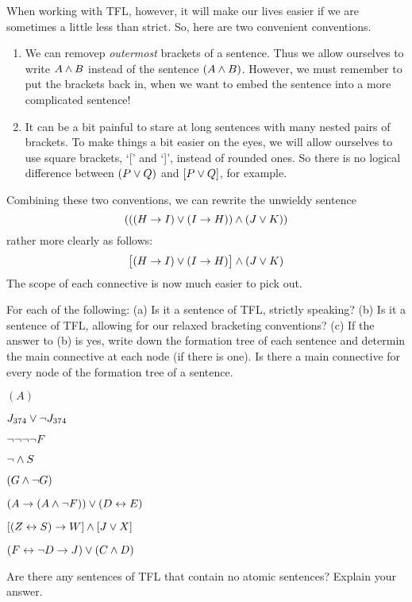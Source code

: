 When working with TFL, however, it will make our lives easier if we are sometimes a little less than strict. So, here are two convenient conventions.
\begin{enumerate}
\item We can removep \emph{outermost} brackets of a sentence. Thus we allow ourselves to write $A\mathbin{\wedge} B$ instead of the sentence $(A\mathbin{\wedge} B)$. However, we must remember to put the brackets back in, when we want to embed the sentence into a more complicated sentence!
\item It can be a bit painful to stare at long sentences with many nested pairs of brackets. To make things a bit easier on the eyes, we will  allow ourselves to use square brackets, `[' and `]', instead of rounded ones. So there is no logical difference between $(P\vee Q)$ and $[P\vee Q]$, for example.
\end{enumerate}

Combining these two conventions, we can rewrite the unwieldy sentence
$$(((H \rightarrow I) \vee (I \rightarrow H)) \mathbin{\wedge} (J \vee K))$$
rather more clearly as follows:
$$\bigl[(H \rightarrow I) \vee (I \rightarrow H)\bigr] \mathbin{\wedge} (J \vee K)$$
The scope of each connective is now much easier to pick out.

\begin{practiceproblems}

\solutions
\problempart
\label{pr.wiffTFL}
For each of the following: (a) Is it a sentence of TFL, strictly speaking? (b) Is it a sentence of TFL, allowing for our relaxed bracketing conventions? (c) If the answer to (b) is yes, write down the formation tree of each sentence and determin the main connective at each node (if there is one). Is there a main connective for every node of the formation tree of a sentence.
\begin{earg}
\item $(A)$\hfill {}
\item $J_{374} \vee \neg J_{374}$\hfill {}
\item $\neg \neg \neg \neg F$\hfill {}
\item $\neg \mathbin{\wedge} S$\hfill {}
\item $(G \mathbin{\wedge} \neg G)$\hfill {}
\item $(A \rightarrow (A \mathbin{\wedge} \neg F)) \vee (D \leftrightarrow E)$\hfill {}
\item $[(Z \leftrightarrow S) \rightarrow W] \mathbin{\wedge} [J \vee X]$\hfill {}
\item $(F \leftrightarrow \neg D \rightarrow J) \vee (C \mathbin{\wedge} D)$\hfill {}
\end{earg}

\problempart
Are there any sentences of TFL that contain no atomic sentences? Explain your answer.
\\

\end{practiceproblems}


